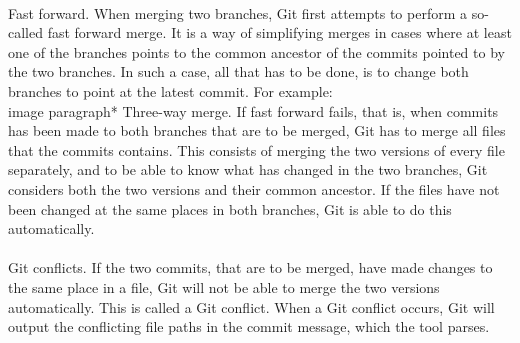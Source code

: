 \paragraph*{}
Fast forward. When merging two branches, Git first attempts to perform a so-called fast forward merge. It is a way of simplifying merges in cases where at least one of the branches points to the common ancestor of the commits pointed to by the two branches. In such a case, all that has to be done, is to change both branches to point at the latest commit. For example:\\
image
paragraph*{}
Three-way merge. If fast forward fails, that is, when commits has been made to both branches that are to be merged, Git has to merge all files that the commits contains. This consists of merging the two versions of every file separately, and to be able to know what has changed in the two branches, Git considers both the two versions and their common ancestor. If the files have not been changed at the same places in both branches, Git is able to do this automatically.
\paragraph*{}
Git conflicts. If the two commits, that are to be merged, have made changes to the same place in a file, Git will not be able to merge the two versions automatically. This is called a Git conflict. When a Git conflict occurs, Git will output the conflicting file paths in the commit message, which the tool parses.
